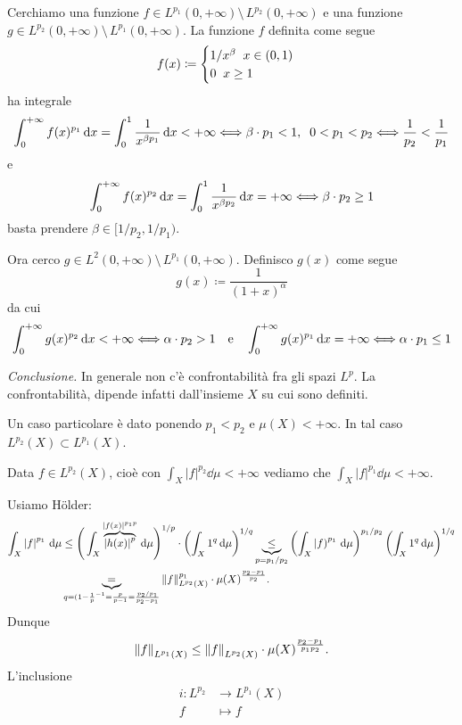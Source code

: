\documentclass[a4paper, 12pt]{report}
\begin{document}
Cerchiamo una funzione $f \in L^{p_1}(0,+\infty) \setminus \, L^{p_2}(0,+\infty)$ e una funzione $g \in L^{p_2}(0,+\infty) \setminus \, L^{p_1}(0,+\infty)$.
La funzione $f$ definita come segue
%
$$
f(x) \coloneqq 
\begin{cases}
1 / x^\beta \;\; x \in (0,1) \\
0 \;\; x \geq 1
\end{cases} 
$$
%
ha integrale 
%
$$
\int_{0}^{+\infty} f(x)^{p_1} \,\mathrm{d} x = \int_{0}^{1} \frac{1}{x^{\beta p_1}} \,\mathrm{d} x < +\infty \Longleftrightarrow \beta \cdot p_1 < 1, \;\; 0 < p_1 < p_2 \Longleftrightarrow \frac{1}{p_2} < \frac{1}{p_1}
$$
e
$$
\int_{0}^{+\infty} f(x)^{p_2} \,\mathrm{d} x = \int_{0}^{1} \frac{1}{x^{\beta p_2}} \,\mathrm{d} x = +\infty \Longleftrightarrow \beta \cdot p_2 \geq 1
$$
%
basta prendere $\beta \in [1/p_2, 1/p_1)$.

Ora cerco $g \in L^2 (0,+\infty) \setminus \, L^{p_1}(0,+\infty)$.
Definisco $g(x)$ come segue
$$
g(x) \coloneqq \frac{1}{(1+x)^\alpha}
$$
da cui
$$
\int_{0}^{+\infty} g(x)^{p_2} \,\mathrm{d} x < +\infty \Longleftrightarrow \alpha \cdot p_2 > 1
\quad
\text{e}
\quad
\int_{0}^{+\infty} g(x)^{p_1} \,\mathrm{d} x = +\infty \Longleftrightarrow \alpha \cdot p_1 \leq 1
$$

\textit{Conclusione.} In generale non c'è confrontabilità fra gli spazi $L^p$. La confrontabilità, dipende infatti dall'insieme $X$ su cui sono definiti.

Un caso particolare è dato ponendo $p_1 < p_2$ e $\mu(X) < +\infty$. In tal caso $L^{p_2}(X) \subset L^{p_1}(X) $.

Data $f \in L^{p_2}(X)$, cioè con $\int_X \left| f \right|^{p_2} \dd \mu < +\infty$ vediamo che  $\int_X \left| f \right|^{p_1} \dd \mu < +\infty$.

Usiamo Hölder:
\begin{align*}
\int_X \left| f \right|^{p_1} \,\mathrm{d} \mu & \leq \Bigg( \int_X \overbrace{\left| h(x) \right|^p}^{\left| f(x) \right|^{p_1 p}}  \,\mathrm{d} \mu  \Bigg)^{1/p} \cdot \left( \int_X 1^q \,\mathrm{d} \mu  \right)^{1/q}
\underbrace{\leq}_{p = p_1 / p_2} \left( \int_X \left| f \right)^{p_1} \,\mathrm{d} \mu  \right)^{p_1 /p_2} \left( \int_X 1^q \,\mathrm{d} \mu  \right)^{1/q} \\
& \underbrace{=}_{q = (1 - \frac{1}{p}^{-1} = \frac{p}{p-1} = \frac{p_2 / p_1}{p_2 - p_1}} \left\lVert f \right\rVert_{L^{p_2}(X)}^{p_1} \cdot \mu(X)^{\frac{p_2 - p_1}{p_2}}.
\end{align*}
%
Dunque
%
$$
\left\lVert f \right\rVert_{L^{p_1}(X)} \leq \left\lVert f \right\rVert_{L^{p_2}(X)}\cdot \mu(X)^{\frac{p_2 - p_1}{p_1 p_2}}.
$$
%
L'inclusione
%
\begin{align*}
i \colon L^{p_2} & \to L^{p_1}(X) \\
f & \mapsto f
\end{align*}
\end{document}
